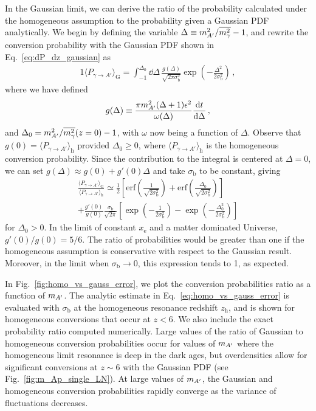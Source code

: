 \documentclass[prd,aps,10pt,nofootinbib,twocolumn,superscriptaddress,preprintnumbers,balancelastpage,longbibliography]{revtex4-1}
\begin{document}
In the Gaussian limit, we can derive the ratio of the probability calculated under the homogeneous assumption to the probability given a Gaussian PDF analytically. 
We begin by defining the variable $\Delta \equiv m_{A^\prime}^2 / \overline{m_\gamma^2} - 1$, and rewrite the conversion probability with the Gaussian PDF shown in Eq.~\eqref{eq:dP_dz_gaussian} as
%
\begin{alignat}{1}
    \langle P_{\gamma \to A'} \rangle_\text{G} = \int_{-1}^{\Delta_0} \dd \Delta \, \frac{g(\Delta)}{\sqrt{2\pi \sigma_\text{b}^2}} \exp \left(-\frac{\Delta^2}{2\sigma_\text{b}^2} \right) \,,
\end{alignat}
%
where we have defined
%
\begin{alignat}{1}
    g(\Delta) \equiv \frac{\pi m_{A^\prime}^2(\Delta + 1) \epsilon^2}{\omega(\Delta)} \frac{\mathrm{d} t}{\mathrm{d} \Delta} \,,
\end{alignat}
%
and $\Delta_0 = m_{A^\prime}^2 / \overline{m_\gamma^2}(z = 0) - 1$, with $\omega$ now being a function of $\Delta$. 
Observe that $g(0) = \langle P_{\gamma \to A'} \rangle_\text{h}$ provided $\Delta_0 \geq 0$, where $\langle P_{\gamma \to A'} \rangle_\text{h}$ is the homogeneous conversion probability. 
Since the contribution to the integral is centered at $\Delta = 0$, we can set $g(\Delta) \approx g(0) + g'(0)\Delta$ and take $\sigma_\text{b}$ to be constant, giving
%
\begin{multline}
    \frac{\langle P_{\gamma \to A'} \rangle_\text{G}}{\langle P_{\gamma \to A'} \rangle_\text{h}} \simeq \frac{1}{2} \left[\text{erf} \left(\frac{1}{\sqrt{2 \sigma_\text{b}^2}}\right) + \text{erf} \left(\frac{\Delta_0}{\sqrt{2 \sigma_\text{b}^2}}\right)\right] \\
    + \frac{g'(0)}{g(0)} \frac{ \sigma_\text{b}}{ \sqrt{2\pi}} \left[\exp \left(-\frac{1}{2\sigma_\text{b}^2}\right) - \exp \left(- \frac{\Delta_0^2}{2\sigma_\text{b}^2}\right)\right]
    \label{eq:homo_vs_gauss_error}
\end{multline}
%
for $\Delta_0 > 0$. 
In the limit of constant $x_\text{e}$ and a matter dominated Universe, $g'(0)/g(0) = 5/6$.
The ratio of probabilities would be greater than one if the homogeneous assumption is conservative with respect to the Gaussian result. 
Moreover, in the limit when $\sigma_\text{b} \to 0$, this expression tends to 1, as expected. 

In Fig.~\ref{fig:homo_vs_gauss_error}, we plot the conversion probabilities ratio as a function of $m_{A^\prime}$. 
The analytic estimate in Eq.~\eqref{eq:homo_vs_gauss_error} is evaluated with $\sigma_\text{b}$ at the homogeneous resonance redshift $z_\text{h}$, and is shown for homogeneous conversions that occur at $z < 6$.  
We also include the exact probability ratio computed numerically.
Large values of the ratio of Gaussian to homogeneous conversion probabilities occur for values of $m_{A^\prime}$ where the homogeneous limit resonance is deep in the dark ages, but overdensities allow for significant conversions at $z \sim 6$ with the Gaussian PDF (see Fig.~\ref{fig:m_Ap_single_LN}).
At large values of $m_{A^\prime}$, the Gaussian and homogeneous conversion probabilities rapidly converge as the variance of fluctuations decreases.  
\end{document}
